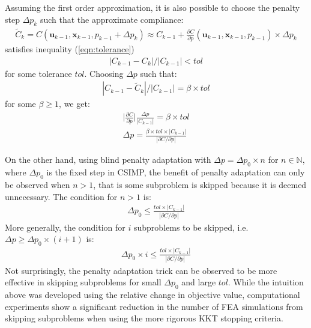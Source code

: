   Assuming the first order approximation, it is also possible to choose the penalty step $\Delta p_k$ such that the approximate compliance:
  \begin{align}
    \tilde{C}_{k} = C(\bm{u}_{k-1}, \bm{x}_{k-1}, p_{k-1} + \Delta p_k) \approx C_{k-1} + \frac{\partial C}{\partial p}(\bm{u}_{k-1}, \bm{x}_{k-1}, p_{k-1}) \times \Delta p_k
  \end{align}
  satisfies inequality (\ref{eqn:tolerance})\begin{align}
    \label{eqn:tolerance}
    |C_{k-1} - C_{k}| / |C_{k-1}| < tol 
  \end{align}
  for some tolerance  $tol$. Choosing $\Delta p$ such that:
  \begin{align}
    |C_{k-1} - \tilde{C}_{k}| / |C_{k-1}| = \beta \times tol
  \end{align}
  for some $\beta \geq 1$, we get:
  \begin{align}
    \label{eqn:blind_adaptive_step}
    \Biggl| \frac{\partial C}{\partial p}\Biggr| \frac{\Delta p}{|C_{k-1}|} = \beta \times tol \nonumber \\
    \Delta p = \frac{\beta \times tol \times |C_{k-1}|}{| \partial C / \partial p|}
  \end{align}

  On the other hand, using blind penalty adaptation with $\Delta p = \Delta p_0 \times n$ for $n \in \mathbb{N}$, where $\Delta p_0$ is the fixed step in CSIMP, the benefit of penalty adaptation can only be observed when $n > 1$, that is some subproblem is skipped because it is deemed unnecessary. The condition for $n > 1$ is:
  \begin{align}
    \Delta p_0 \leq \frac{tol \times |C_{k-1}|}{|\partial C / \partial p|}    
  \end{align}
  More generally, the condition for $i$ subproblems to be skipped, i.e. $\Delta p \geq \Delta p_0 \times (i + 1)$ is:
  \begin{align}
    \Delta p_0 \times i \leq \frac{tol \times |C_{k-1}|}{| \partial C / \partial p|}    
  \end{align}
  Not surprisingly, the penalty adaptation trick can be observed to be more effective in skipping subproblems for small $\Delta p_0$ and large $tol$. While the intuition above was developed using the relative change in objective value, computational experiments show a significant reduction in the number of FEA simulations from skipping subproblems when using the more rigorous KKT stopping criteria.

